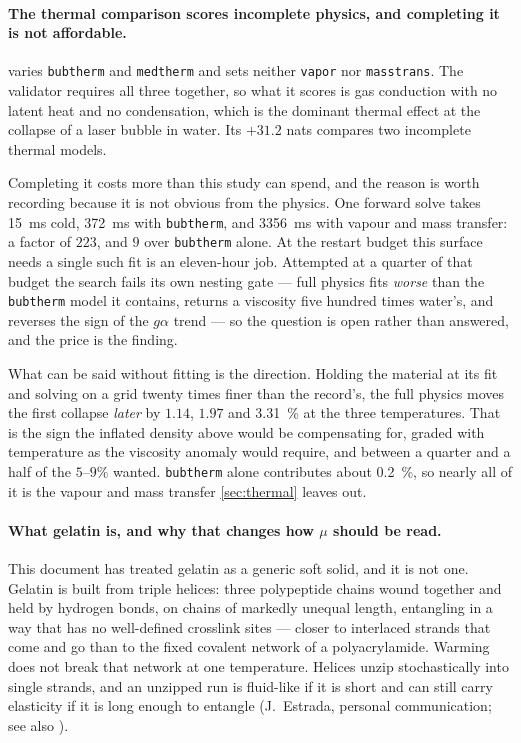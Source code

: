 \documentclass[10pt]{article}
\begin{document}
\paragraph{The thermal comparison scores incomplete physics, and completing it is not affordable.}
 varies \texttt{bubtherm} and \texttt{medtherm} and sets neither
\texttt{vapor} nor \texttt{masstrans}. The validator requires all three together, so what it
scores is gas conduction with no latent heat and no condensation, which is the dominant thermal
effect at the collapse of a laser bubble in water. Its $+31.2$ nats compares two incomplete
thermal models.

Completing it costs more than this study can spend, and the reason is worth recording because it
is not obvious from the physics. One forward solve takes \SI{15}{\milli\second} cold,
\SI{372}{\milli\second} with \texttt{bubtherm}, and \SI{3356}{\milli\second} with vapour and mass
transfer: a factor of $223$, and $9$ over \texttt{bubtherm} alone. At the restart budget this
surface needs a single such fit is an eleven-hour job. Attempted at a quarter of that budget the
search fails its own nesting gate --- full physics fits \emph{worse} than the \texttt{bubtherm}
model it contains, returns a viscosity five hundred times water's, and reverses the sign of the
$g\alpha$ trend --- so the question is open rather than answered, and the price is the finding.

What can be said without fitting is the direction. Holding the material at its fit and solving on
a grid twenty times finer than the record's, the full physics moves the first collapse
\emph{later} by $1.14$, $1.97$ and \SI{3.31}{\percent} at the three temperatures. That is the
sign the inflated density above would be compensating for, graded with temperature as the
viscosity anomaly would require, and between a quarter and a half of the $5$--$9\%$ wanted.
\texttt{bubtherm} alone contributes about \SI{0.2}{\percent}, so nearly all of it is the vapour
and mass transfer \cref{sec:thermal} leaves out.

\paragraph{What gelatin is, and why that changes how $\mu$ should be read.}
This document has treated gelatin as a generic soft solid, and it is not one. Gelatin is built
from triple helices: three polypeptide chains wound together and held by hydrogen bonds, on
chains of markedly unequal length, entangling in a way that has no well-defined crosslink sites
--- closer to interlaced strands that come and go than to the fixed covalent network of a
polyacrylamide. Warming does not break that network at one temperature. Helices unzip
stochastically into single strands, and an unzipped run is fluid-like if it is short and can
still carry elasticity if it is long enough to entangle (J.~Estrada, personal communication;
see also \citet{tenijenhuis1997thermoreversible}).
\end{document}
